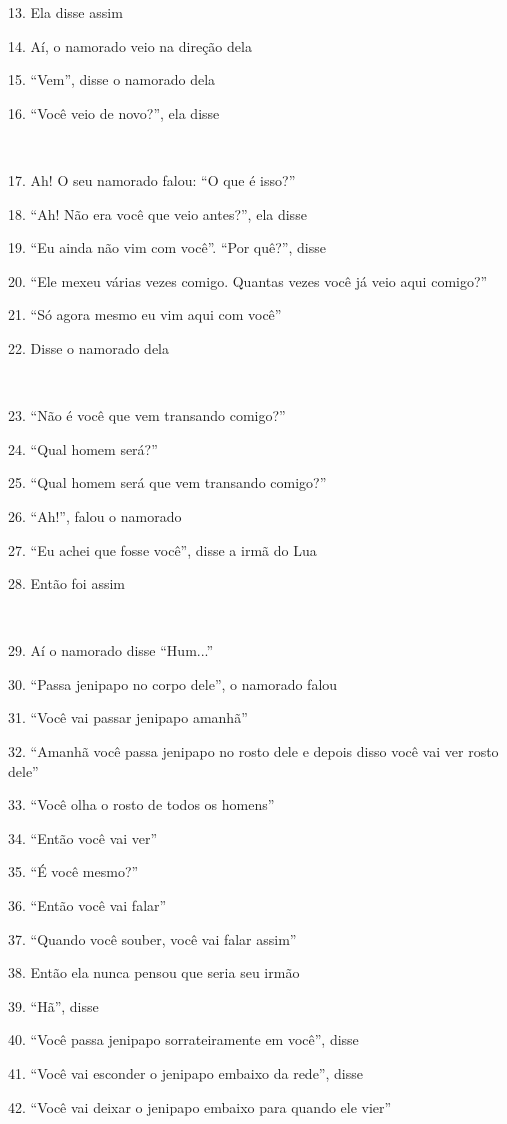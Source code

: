 13. Ela disse assim

14. Aí, o namorado veio na direção dela

15. ``Vem'', disse o namorado dela

16. ``Você veio de novo?'', ela disse

~

17. Ah! O seu namorado falou: ``O que é isso?''

18. ``Ah! Não era você que veio antes?'', ela disse

19. ``Eu ainda não vim com você''. ``Por quê?'', disse

20. ``Ele mexeu várias vezes comigo. Quantas vezes você já veio aqui comigo?''

21. ``Só agora mesmo eu vim aqui com você''

22. Disse o namorado dela

~

23. ``Não é você que vem transando comigo?''

24. ``Qual homem será?''

25. ``Qual homem será que vem transando comigo?''

26. ``Ah!'', falou o namorado

27. ``Eu achei que fosse você'', disse a irmã do Lua

28. Então foi assim

~

29. Aí o namorado disse ``Hum...''

30. ``Passa jenipapo no corpo dele'', o namorado falou

31. ``Você vai passar jenipapo amanhã''

32. ``Amanhã você passa jenipapo no rosto dele e depois disso você vai
ver rosto dele''

33. ``Você olha o rosto de todos os homens''

34. ``Então você vai ver''

35. ``É você mesmo?''

36. ``Então você vai falar''

37. ``Quando você souber, você vai falar assim''

38. Então ela nunca pensou que seria seu irmão

39. ``Hã'', disse

40. ``Você passa jenipapo sorrateiramente em você'', disse

41. ``Você vai esconder o jenipapo embaixo da rede'', disse

42. ``Você vai deixar o jenipapo embaixo para quando ele vier''

